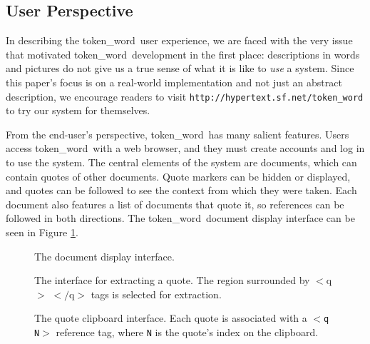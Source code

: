 \documentclass{acm_proc_article-sp}
\newcommand{\tokenWord}{token\_word}
\begin{document}
\subsection{User Perspective}
In describing the \tokenWord \  user experience, we are faced with the very issue that motivated \tokenWord \  development in the first place:  descriptions in words and pictures do not give us a true sense of what it is like to \textit{use} a system.
Since this paper's focus is on a real-world implementation and not just an abstract description, we encourage readers to visit \texttt{http://hypertext.sf.net/token\_word} to try our system for themselves. 

From the end-user's perspective, \tokenWord \  has many sal\-ient features.
Users access \tokenWord \  with a web browser, and they must create accounts and log in to use the system.  
The central elements of the system are documents, which can contain quotes of other documents.
Quote markers can be hidden or displayed, and quotes can be followed to see the context from which they were taken.
Each document also features a list of documents that quote it, so references can be followed in both directions.
The \tokenWord \  document display interface can be seen in Figure \ref{fig:mainScreen}.

\begin{figure}[t]
\centering
{}
\caption{The document display interface.}
\label{fig:mainScreen}
\end{figure}  


\begin{figure}[t]
\centering
{}
\caption{The interface for extracting a quote.  The region surrounded by $<$q$>$ $<$$/$q$>$ tags is selected for extraction.}
\label{fig:extractQuote}
\end{figure}

\begin{figure}[t]
\centering
{}
\caption{The quote clipboard interface.  Each quote is associated with a $<$\texttt{q N}$>$ reference tag, where \texttt{N} is the quote's index on the clipboard.}
\label{fig:quoteClipboard}
\end{figure}
\end{document}
